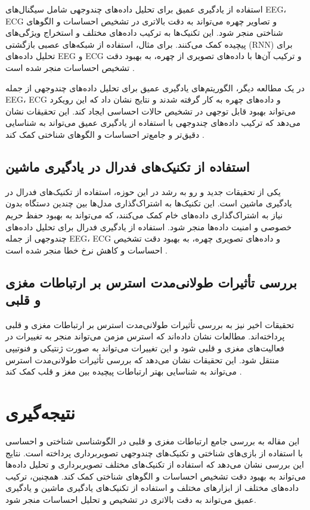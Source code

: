 \documentclass[12pt]{article}
\begin{document}
استفاده از یادگیری عمیق برای تحلیل داده‌های چندوجهی شامل سیگنال‌های EEG، ECG و تصاویر چهره می‌تواند به دقت بالاتری در تشخیص احساسات و الگوهای شناختی منجر شود. این تکنیک‌ها به ترکیب داده‌های مختلف و استخراج ویژگی‌های پیچیده کمک می‌کنند. برای مثال، استفاده از شبکه‌های عصبی بازگشتی (RNN) برای تحلیل داده‌های EEG و ECG و ترکیب آن‌ها با داده‌های تصویری از چهره، به بهبود دقت تشخیص احساسات منجر شده است \cite{Koelstra2012}.

در یک مطالعه دیگر، الگوریتم‌های یادگیری عمیق برای تحلیل داده‌های چندوجهی از جمله EEG، ECG و داده‌های چهره به کار گرفته شدند و نتایج نشان داد که این رویکرد می‌تواند بهبود قابل توجهی در تشخیص حالات احساسی ایجاد کند. این تحقیقات نشان می‌دهد که ترکیب داده‌های چندوجهی با استفاده از یادگیری عمیق می‌تواند به شناسایی دقیق‌تر و جامع‌تر احساسات و الگوهای شناختی کمک کند \cite{Dzedzickis2020}.

\subsection{استفاده از تکنیک‌های فدرال در یادگیری ماشین}

یکی از تحقیقات جدید و رو به رشد در این حوزه، استفاده از تکنیک‌های فدرال در یادگیری ماشین است. این تکنیک‌ها به اشتراک‌گذاری مدل‌ها بین چندین دستگاه بدون نیاز به اشتراک‌گذاری داده‌های خام کمک می‌کنند، که می‌تواند به بهبود حفظ حریم خصوصی و امنیت داده‌ها منجر شود. استفاده از یادگیری فدرال برای تحلیل داده‌های چندوجهی از جمله EEG، ECG و داده‌های تصویری چهره، به بهبود دقت تشخیص احساسات و کاهش نرخ خطا منجر شده است \cite{Li2019}.

\subsection{بررسی تأثیرات طولانی‌مدت استرس بر ارتباطات مغزی و قلبی}

تحقیقات اخیر نیز به بررسی تأثیرات طولانی‌مدت استرس بر ارتباطات مغزی و قلبی پرداخته‌اند. مطالعات نشان داده‌اند که استرس مزمن می‌تواند منجر به تغییرات در فعالیت‌های مغزی و قلبی شود و این تغییرات می‌تواند به صورت ژنتیکی و فنوتیپی منتقل شود. این تحقیقات نشان می‌دهد که بررسی تأثیرات طولانی‌مدت استرس می‌تواند به شناسایی بهتر ارتباطات پیچیده بین مغز و قلب کمک کند \cite{Wager2009}.

\section{نتیجه‌گیری}

این مقاله به بررسی جامع ارتباطات مغزی و قلبی در الگوشناسی شناختی و احساسی با استفاده از بازی‌های شناختی و تکنیک‌های چندوجهی تصویربرداری پرداخته است. نتایج این بررسی نشان می‌دهد که استفاده از تکنیک‌های مختلف تصویربرداری و تحلیل داده‌ها می‌تواند به بهبود دقت تشخیص احساسات و الگوهای شناختی کمک کند. همچنین، ترکیب داده‌های مختلف از ابزارهای مختلف و استفاده از تکنیک‌های یادگیری ماشین و یادگیری عمیق می‌تواند به دقت بالاتری در تشخیص و تحلیل احساسات منجر شود.
\end{document}
